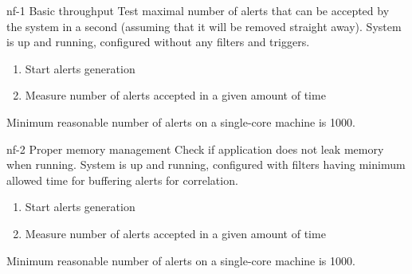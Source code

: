 \testCase
{nf-1}
{Basic throughput}
{Test maximal number of alerts that can be accepted by the system in a second (assuming that it will be removed straight away).}
{System is up and running, configured without any filters and triggers.}
{
\begin{enumerate}
\item{Start alerts generation}
\item{Measure number of alerts accepted in a given amount of time}
\end{enumerate}
}
{Minimum reasonable number of alerts on a single-core machine is 1000.}


\testCase
{nf-2}
{Proper memory management}
{Check if application does not leak memory when running.}
{System is up and running, configured with filters having minimum allowed time for buffering alerts for correlation.}
{
\begin{enumerate}
\item{Start alerts generation}
\item{Measure number of alerts accepted in a given amount of time}
\end{enumerate}
}
{Minimum reasonable number of alerts on a single-core machine is 1000.}
